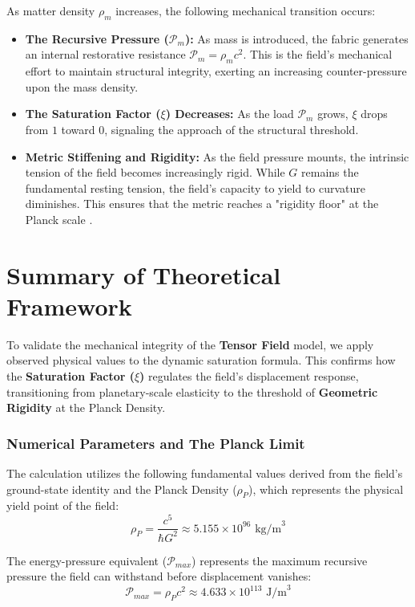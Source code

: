 \documentclass{article}
\begin{document}
As matter density $\rho_m$ increases, the following mechanical transition occurs:
\begin{itemize}
\item \textbf{The Recursive Pressure ($\mathcal{P}_m$):} As mass is introduced, the fabric generates an internal restorative resistance $\mathcal{P}_m = \rho_m c^2$. This is the field's mechanical effort to maintain structural integrity, exerting an increasing counter-pressure upon the mass density.
\item \textbf{The Saturation Factor ($\xi$) Decreases:} As the load $\mathcal{P}_m$ grows, $\xi$ drops from $1$ toward $0$, signaling the approach of the structural threshold.
\item \textbf{Metric Stiffening and Rigidity:} As the field pressure mounts, the intrinsic tension of the field becomes increasingly rigid. While $G$ remains the fundamental resting tension, the field’s capacity to yield to curvature diminishes. This ensures that the metric reaches a "rigidity floor" at the Planck scale \cite{Planck1899}.
\end{itemize}

\section{Summary of Theoretical Framework}

To validate the mechanical integrity of the \textbf{Tensor Field} model, we apply observed physical values to the dynamic saturation formula. This confirms how the \textbf{Saturation Factor ($\xi$)} regulates the field's displacement response, transitioning from planetary-scale elasticity to the threshold of \textbf{Geometric Rigidity} at the Planck Density.

\subsubsection{Numerical Parameters and The Planck Limit}
The calculation utilizes the following fundamental values derived from the field's ground-state identity and the Planck Density ($\rho_P$), which represents the physical yield point of the field:
\begin{equation}
\rho_P = \frac{c^5}{\hbar G^2} \approx 5.155 \times 10^{96} \text{ kg/m}^3
\end{equation}

The energy-pressure equivalent ($\mathcal{P}_{max}$) represents the maximum recursive pressure the field can withstand before displacement vanishes:
\begin{equation}
\mathcal{P}_{max} = \rho_P c^2 \approx 4.633 \times 10^{113} \text{ J/m}^3
\end{equation}
\end{document}
